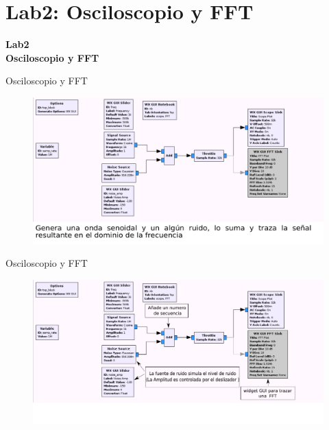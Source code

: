 \section{Lab2: Osciloscopio y FFT}
\begin{frame}{}


\bfseries{\textrm{\LARGE Lab2\\ \Large Osciloscopio y FFT}}
\raggedright
\end{frame}

\begin{frame}{Osciloscopio y FFT}


\begin{figure}[H]
\centering
\includegraphics[width=\textwidth]{lab2/pdf/lab201.pdf}
\end{figure}
\end{frame}

\begin{frame}{Osciloscopio y FFT}
\begin{figure}[H]
\centering
\includegraphics[width=\textwidth]{lab2/pdf/lab202.pdf}
\end{figure}
\end{frame}

